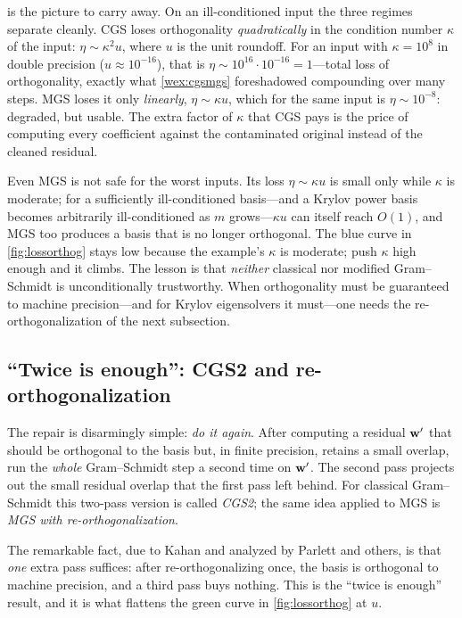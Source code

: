  is the picture to carry away. On an ill-conditioned input the
three regimes separate cleanly. CGS loses orthogonality \emph{quadratically} in the
condition number $\kappa$ of the input: $\eta \sim \kappa^2 u$, where $u$ is the unit
roundoff. For an input with $\kappa = 10^8$ in double precision
($u \approx 10^{-16}$), that is $\eta \sim 10^{16}\cdot 10^{-16} = 1$---total loss of
orthogonality, exactly what \cref{wex:cgsmgs} foreshadowed compounding over many
steps. MGS loses it only \emph{linearly}, $\eta \sim \kappa u$, which for the same
input is $\eta \sim 10^{-8}$: degraded, but usable. The extra factor of $\kappa$ that
CGS pays is the price of computing every coefficient against the contaminated
original instead of the cleaned residual.

\begin{pitfall}
Even MGS is not safe for the worst inputs. Its loss $\eta \sim \kappa u$ is small only
while $\kappa$ is moderate; for a sufficiently ill-conditioned basis---and a Krylov
power basis becomes arbitrarily ill-conditioned as $m$ grows---$\kappa u$ can itself
reach $O(1)$, and MGS too produces a basis that is no longer orthogonal. The blue
curve in \cref{fig:lossorthog} stays low because the example's $\kappa$ is moderate;
push $\kappa$ high enough and it climbs. The lesson is that \emph{neither} classical
nor modified Gram--Schmidt is unconditionally trustworthy. When orthogonality must be
guaranteed to machine precision---and for Krylov eigensolvers it must---one needs the
re-orthogonalization of the next subsection.
\end{pitfall}

\subsection{``Twice is enough'': CGS2 and re-orthogonalization}
\label{sec:twiceenough}

The repair is disarmingly simple: \emph{do it again}. After computing a residual
$\mathbf{w}'$ that should be orthogonal to the basis but, in finite precision, retains a
small overlap, run the \emph{whole} Gram--Schmidt step a second time on $\mathbf{w}'$. The
second pass projects out the small residual overlap that the first pass left behind.
For classical Gram--Schmidt this two-pass version is called \emph{CGS2}; the same
idea applied to MGS is \emph{MGS with re-orthogonalization}.

The remarkable fact, due to Kahan and analyzed by Parlett and others, is that
\emph{one} extra pass suffices: after re-orthogonalizing once, the basis is
orthogonal to machine precision, and a third pass buys nothing. This is the ``twice
is enough'' result, and it is what flattens the green curve in \cref{fig:lossorthog}
at $u$.

